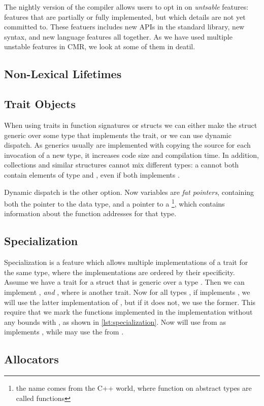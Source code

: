 The nightly version of the compiler allows users to opt in on \emph{untsable} features: features
that are partially or fully implemented, but which details are not yet committed to. These featuers
includes new APIs in the standard library, new syntax, and new language features all together.
As we have used multiple unstable features in CMR, we look at some of them in deatil.


\subsection{Non-Lexical Lifetimes\label{sec:nll}}
\lorem{}


\subsection{Trait Objects\label{sec:trait-objects}}

When using traits in function signatures or structs we can either make the struct generic over some
type that implements the trait, or we can use dynamic dispatch. As generics usually are implemented
with copying the source for each invocation of a new type, it increases code size and compilation
time. In addition, collections and similar structures cannot mix different types: a 
cannot both contain elements of type  and , even if both implements .

Dynamic dispatch is the other option. Now variables are \emph{fat pointers}, containing both the
pointer to the data type, and a pointer to a \footnote{the name  comes
from the C++ world, where function on abstract types are called  functions}, which
contains information about the function addresses for that type. 

\begin{figure}[ht]
  \centering
  
\end{figure}




\subsection{Specialization\label{sec:specialization}}

Specialization is a feature which allows multiple implementations of a trait for the same type,
where the implementations are ordered by their specificity. Assume we have a trait  for a
struct that is generic over a type . Then we can implement ,
\emph{and} , where  is another trait. Now for all types
, if  implements , we will use the latter implementation of , but
if it does not, we use the former. This require that we mark the functions implemented in the
implementation without any bounds with , as shown in \cref{lst:specialization}. Now
 will use  from  as  implements
, while  may use the  from .






\subsection{Allocators\label{sec:allocators}}
\lorem{}

